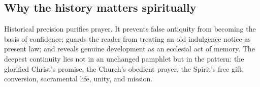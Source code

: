 \subsection{Why the history matters spiritually}

Historical precision purifies prayer. It prevents false antiquity from becoming the basis of confidence; guards the reader from treating an old indulgence notice as present law; and reveals genuine development as an ecclesial act of memory. The deepest continuity lies not in an unchanged pamphlet but in the pattern: the glorified Christ's promise, the Church's obedient prayer, the Spirit's free gift, conversion, sacramental life, unity, and mission.

